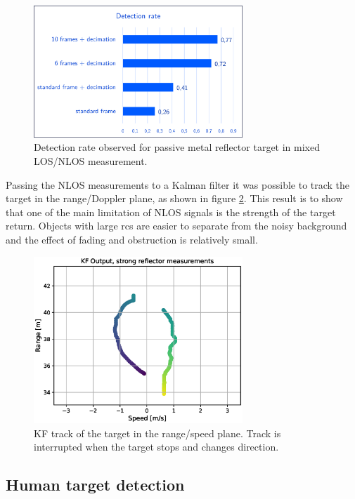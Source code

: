 \begin{figure}[H]
	\centering
	\includegraphics[width=0.7\textwidth]{Images/Test1/detect_hist/detect_hist_cabinet_LMsans.png}
	\caption{\small Detection rate observed for passive metal reflector target in mixed LOS/NLOS measurement.}
	\label{fig:Test1_detect_rate_strong_ref}
\end{figure}
Passing the NLOS measurements to a Kalman filter it was possible to track the target in the range/Doppler plane, as shown in figure \ref{fig:Test1_kf_track_strong_ref}. This result is to show that one of the main limitation of NLOS signals is the strength of the target return. Objects with large \gls{rcs} are easier to separate from the noisy background and the effect of fading and obstruction is relatively small.
\begin{figure}[H]
	\centering
	\includegraphics[width=0.7\textwidth]{Images/Test1/kf_track.eps}
	\caption{\small KF track of the target in the range/speed plane. Track is interrupted when the target stops and changes direction.}
	\label{fig:Test1_kf_track_strong_ref}
\end{figure}


\subsection{Human target detection}

